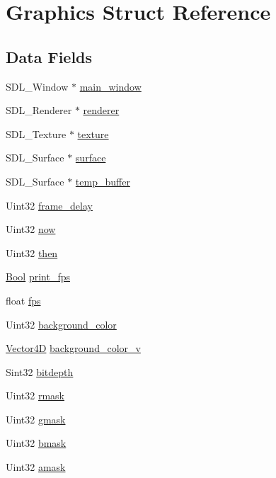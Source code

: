 \hypertarget{struct_graphics}{}\section{Graphics Struct Reference}
\label{struct_graphics}
\subsection*{Data Fields}
\begin{DoxyCompactItemize}
\item 
S\+D\+L\+\_\+\+Window $\ast$ \hyperlink{struct_graphics_a6d874aedde3f9bbb27b10879f2136510}{main\+\_\+window}
\item 
S\+D\+L\+\_\+\+Renderer $\ast$ \hyperlink{struct_graphics_a966da7a60c4ea3ba301e26ccc5efe452}{renderer}
\item 
S\+D\+L\+\_\+\+Texture $\ast$ \hyperlink{struct_graphics_a859b8efbf9abe8e82757ee5c75a0c97c}{texture}
\item 
S\+D\+L\+\_\+\+Surface $\ast$ \hyperlink{struct_graphics_a2f5cac12e913bcfcff660305bf88dd3b}{surface}
\item 
S\+D\+L\+\_\+\+Surface $\ast$ \hyperlink{struct_graphics_a7dbe1c1c02721b94a0a20771dfc2ace6}{temp\+\_\+buffer}
\item 
Uint32 \hyperlink{struct_graphics_a8d6bd7c397df4eeb9b742e687e170f38}{frame\+\_\+delay}
\item 
Uint32 \hyperlink{struct_graphics_acd416cb12b6be767816f4b132e0139f2}{now}
\item 
Uint32 \hyperlink{struct_graphics_a44ae6bd6838debc09ab2e58b992b9e3b}{then}
\item 
\hyperlink{gf2d__types_8h_a4a1d8cd6ef103fc1f5d5307454f581e1}{Bool} \hyperlink{struct_graphics_a56879b567818df346c0bd9c72258e39b}{print\+\_\+fps}
\item 
float \hyperlink{struct_graphics_a4f50e96f11c68d45dc109185efe011ad}{fps}
\item 
Uint32 \hyperlink{struct_graphics_ae1a2c84bb5fab92239b98f2ee5d7b72d}{background\+\_\+color}
\item 
\hyperlink{struct_vector4_d}{Vector4D} \hyperlink{struct_graphics_af80b492818c20f805c4067a6a1b2c750}{background\+\_\+color\+\_\+v}
\item 
Sint32 \hyperlink{struct_graphics_a433154291df15ef1463eda4941fa2fba}{bitdepth}
\item 
Uint32 \hyperlink{struct_graphics_a05b5255942e441c4fa513bef0289e4cc}{rmask}
\item 
Uint32 \hyperlink{struct_graphics_a43613889bd9d644775e8da9db3a32375}{gmask}
\item 
Uint32 \hyperlink{struct_graphics_a14b0866344628e753ba7670a11b780b4}{bmask}
\item 
Uint32 \hyperlink{struct_graphics_ab8c1e3f1165d8eaaef52fe2bcbb06726}{amask}
\end{DoxyCompactItemize}


